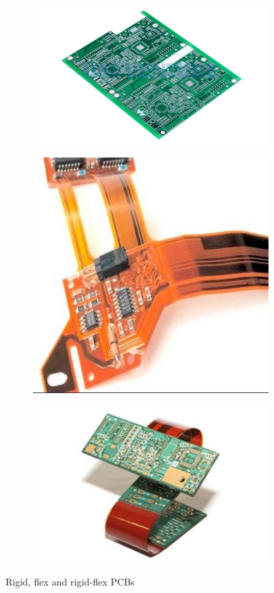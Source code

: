 \documentclass[final]{cubedoc}
\begin{document}
	\begin{figure}[h!]
		\centering
		\begin{subfigure}{.3\textwidth}
			\centering
			\includegraphics[height=0.2\textheight, width=.8\textwidth]{assets/rigid.jpg}
			\label{fig:sub1}
		\end{subfigure}%
		\begin{subfigure}{.3\textwidth}
			\centering
			\includegraphics[height=0.2\textheight, width=.8\textwidth]{assets/flex.jpg}
			\label{fig:sub2}
		\end{subfigure}
		\begin{subfigure}{.3\textwidth}
			\centering
			\includegraphics[height=0.2\textheight, width=.8\textwidth]{assets/rigid_flex.jpg}
			\label{fig:sub2}
		\end{subfigure}
		\caption{Rigid, flex and rigid-flex PCBs}
		\label{fig:test}
	\end{figure}
	
\end{document}
